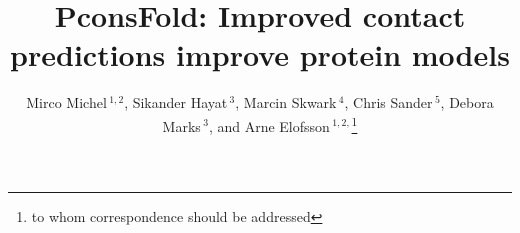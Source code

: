 \documentclass{bioinfo}
\begin{document}

\title[PconsFold]{PconsFold: Improved contact predictions improve
 protein models}
\author[M.Michel \textit{et~al}]{Mirco Michel\,$^{1,2}$, Sikander
  Hayat\,$^{3}$, Marcin Skwark\,$^{4}$, Chris Sander\,$^{5}$, Debora Marks\,$^{3}$,  and Arne Elofsson\,$^{1,2,}$\footnote{to whom correspondence should be addressed}}
\address{$^{1}$Department of Biochemistry and Biophysics, Stockholm University, 10691 Stockholm, Sweden, 
$^{2}$Science for Life Laboratory, Box 1031, 17121 Solna, Sweden, 
$^{3}$Department of Systems Biology, Harvard Medical School, Boston, Massachusetts, USA, 
$^{4}$Department of Information and Computer Science, Aalto University, PO Box 15400, FI-00076 Aalto, Finland, and
$^{5}$Computational Biology Center, Memorial Sloan-Kettering Cancer Center, New York, New York, USA}



\maketitle
\end{document}
